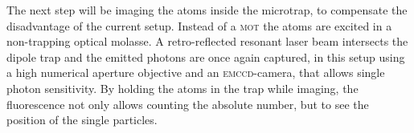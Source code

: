 The next step will be imaging the atoms inside the microtrap, to compensate the disadvantage of the current setup. Instead of a \textsc{mot} the atoms are excited in a non-trapping optical molasse. A retro-reflected resonant laser beam intersects the dipole trap and the emitted photons are once again captured, in this setup using a high numerical aperture objective and an \textsc{emccd}-camera, that allows single photon sensitivity. By holding the atoms in the trap while imaging, the fluorescence not only allows counting the absolute number, but to see the position of the single particles.



